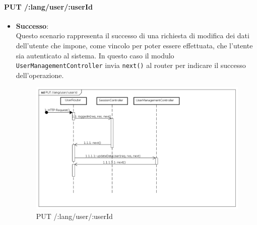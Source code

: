 \paragraph{PUT /:lang/user/:userId}
\begin{itemize}
\item \textbf{Successo}:
\\
Questo scenario rappresenta il successo di una richiesta di modifica dei dati dell'utente che impone, come vincolo per poter essere effettuata, che l'utente sia autenticato al sistema.  
In questo caso il modulo \texttt{UserManagementController} invia \texttt{next()} al router per indicare il successo dell'operazione.
\label{Procedura di modifica dati utente}
\begin{figure}[ht]
	\centering
	\includegraphics[scale=0.40]{UML/DiagrammiDiSequenza/Back-end/PUT_LangUserUseridSuccess.png}
	\caption{PUT /:lang/user/:userId}
\end{figure}
\FloatBarrier


\end{itemize}
